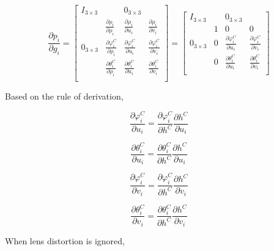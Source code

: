 \begin{equation}
\frac{\partial p_{i}}{\partial g_{i}}=\begin{bmatrix}
I_{3\times 3} & & 0_{3\times 3} & \\
 & \frac{\partial \rho_{i}}{\partial \rho_{i}} & 
\frac{\partial \rho_{i}}{\partial u_{i}} & 
\frac{\partial \rho _{i}}{\partial v_{i}}\\
0_{3\times 3} & \frac{\partial \varphi_{i}^{C}}{\partial \rho_{i}} & 
\frac{\partial \varphi_{i}^{C}}{\partial u_{i}} & 
\frac{\partial \varphi_{i}^{C}}{\partial v_{i}} \\
 & \frac{\partial \theta_{i}^{C}}{\partial \rho_{i}} & 
\frac{\partial \theta_{i}^{C}}{\partial u_{i}} & 
\frac{\partial \theta_{i}^{C}}{\partial v_{i}} \\
\end{bmatrix} = \begin{bmatrix}
I_{3\times 3} & & 0_{3\times 3} & \\
 & 1 & 0 & 0 \\
0_{3\times 3} & 0 & \frac{\partial \varphi _{i}^{C}}{\partial u_{i}} 
& \frac{\partial \varphi_{i}^{C}}{\partial v_{i}} \\
 & 0 & \frac{\partial \theta_{i}^{C}}{\partial u_{i}} & 
\frac{\partial \theta_{i}^{C}}{\partial v_{i}} \\
\end{bmatrix}
\end{equation}

\noindent Based on the rule of derivation, 

$$\frac{\partial \varphi_{i}^{C}}{\partial u_{i}}=\frac{\partial 
\varphi_{i}^{C}}{\partial h^{C}}\frac{\partial h^{C}}{\partial u_{i}}$$


$$\frac{\partial \theta _{i}^{C}}{\partial u_{i}}=\frac{\partial \theta 
_{i}^{C}}{\partial h^{C}}\frac{\partial h^{C}}{\partial u_{i}}$$


$$\frac{\partial \varphi _{i}^{C}}{\partial v_{i}}=\frac{\partial 
\varphi _{i}^{C}}{\partial h^{C}}\frac{\partial h^{C}}{\partial v_{i}}$$

$$\frac{\partial \theta _{i}^{C}}{\partial v_{i}}=\frac{\partial \theta 
_{i}^{C}}{\partial h^{C}}\frac{\partial h^{C}}{\partial v_{i}}$$


\noindent When lens distortion is ignored,

